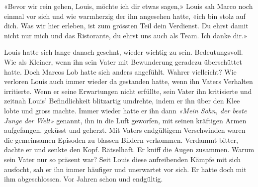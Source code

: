 «Bevor wir rein gehen, Louis, möchte ich dir etwas sagen,» Louis sah Marco noch einmal vor sich und wie warmherzig der ihn angesehen hatte, «ich bin stolz auf dich. Was wir hier erleben, ist zum grössten Teil dein Verdienst. Du ehrst damit nicht nur mich und das Ristorante, du ehrst uns auch als Team. Ich danke dir.»

Louis hatte sich lange danach gesehnt, wieder wichtig zu sein. Bedeutungsvoll. Wie als Kleiner, wenn ihn sein Vater mit Bewunderung geradezu überschüttet hatte. Doch Marcos Lob hatte sich anders angefühlt. Wahrer vielleicht? Wie verloren Louis auch immer wieder da gestanden hatte, wenn ihn Vaters Verhalten irritierte. Wenn er seine Erwartungen nicht erfüllte, sein Vater ihn kritisierte und zeitnah Louis’ Befindlichkeit blitzartig umdrehte, indem er ihn über den Klee lobte und gross machte. Immer wieder hatte er ihn dann \emph{«Mein Sohn, der beste Junge der Welt»} genannt, ihn in die Luft geworfen, mit seinen kräftigen Armen aufgefangen, geküsst und geherzt. Mit Vaters endgültigem Verschwinden waren die gemeinsamen Episoden zu blassen Bildern verkommen. Verdammt bitter, dachte er und senkte den Kopf.
Rätselhaft. Er kniff die Augen zusammen. Warum sein Vater nur so präsent war? Seit Louis diese aufreibenden Kämpfe mit sich ausfocht, sah er ihn immer häufiger und unerwartet vor sich. Er hatte doch mit ihm abgeschlossen. Vor Jahren schon und endgültig.

\sectionbreak

